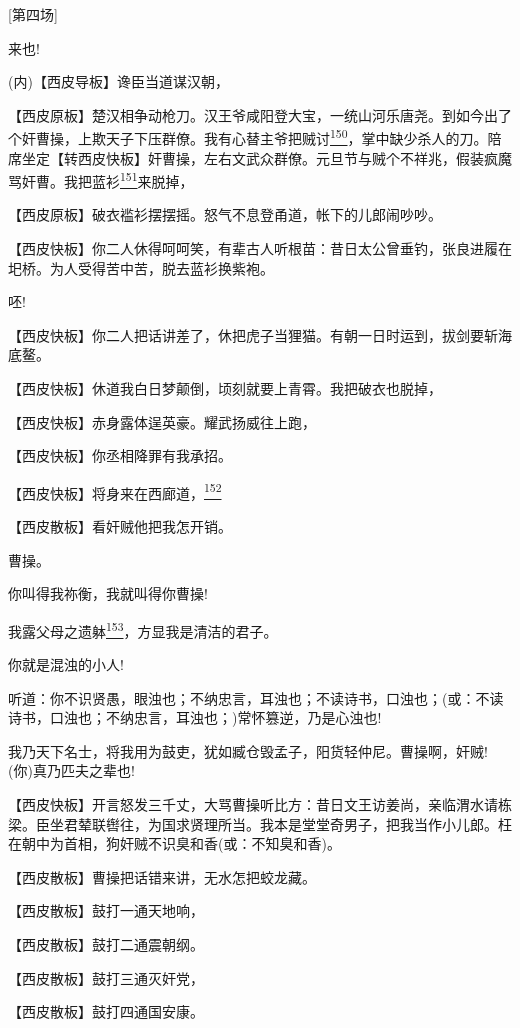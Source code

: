 {[}第四场{]}

来也!

(内)【西皮导板】谗臣当道谋汉朝，

【西皮原板】楚汉相争动枪刀。汉王爷咸阳登大宝，一统山河乐唐尧。到如今出了个奸曹操，上欺天子下压群僚。我有心替主爷把贼讨\protect\hyperlink{fn150}{\textsuperscript{150}}，掌中缺少杀人的刀。陪席坐定【转西皮快板】奸曹操，左右文武众群僚。元旦节与贼个不祥兆，假装疯魔骂奸曹。我把蓝衫\protect\hyperlink{fn151}{\textsuperscript{151}}来脱掉，

【西皮原板】破衣褴衫摆摆摇。怒气不息登甬道，帐下的儿郎闹吵吵。

【西皮快板】你二人休得呵呵笑，有辈古人听根苗：昔日太公曾垂钓，张良进履在圯桥。为人受得苦中苦，脱去蓝衫换紫袍。

呸!

【西皮快板】你二人把话讲差了，休把虎子当狸猫。有朝一日时运到，拔剑要斩海底鳌。

【西皮快板】休道我白日梦颠倒，顷刻就要上青霄。我把破衣也脱掉，

【西皮快板】赤身露体逞英豪。耀武扬威往上跑，

【西皮快板】你丞相降罪有我承招。

【西皮快板】将身来在西廊道，\protect\hyperlink{fn152}{\textsuperscript{152}}

【西皮散板】看奸贼他把我怎开销。

曹操。

你叫得我祢衡，我就叫得你曹操!

我露父母之遗躰\protect\hyperlink{fn153}{\textsuperscript{153}}，方显我是清洁的君子。

你就是混浊的小人!

听道：你不识贤愚，眼浊也；不纳忠言，耳浊也；不读诗书，口浊也；(或：不读诗书，口浊也；不纳忠言，耳浊也；)常怀篡逆，乃是心浊也!

我乃天下名士，将我用为鼓吏，犹如臧仓毁孟子，阳货轻仲尼。曹操啊，奸贼!(你)真乃匹夫之辈也!

【西皮快板】开言怒发三千丈，大骂曹操听比方：昔日文王访姜尚，亲临渭水请栋梁。臣坐君辇联辔往，为国求贤理所当。我本是堂堂奇男子，把我当作小儿郎。枉在朝中为首相，狗奸贼不识臭和香(或：不知臭和香)。

【西皮散板】曹操把话错来讲，无水怎把蛟龙藏。

【西皮散板】鼓打一通天地响，

【西皮散板】鼓打二通震朝纲。

【西皮散板】鼓打三通灭奸党，

【西皮散板】鼓打四通国安康。

